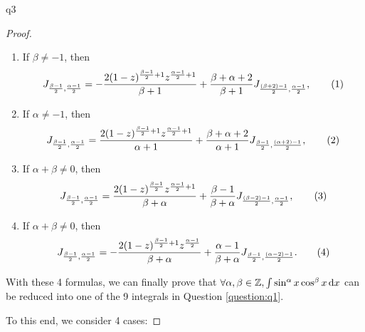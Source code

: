 \documentclass[reqno]{alittlebear}
\begin{document}
\begin{exercise}{}{}
\begin{question}{}{q3}
\begin{proof}
            \begin{enumerate}
                \item If $\beta\neq-1$, then \[J_{\frac{\beta-1}{2},\frac{\alpha-1}{2}} = -\frac{2(1-z)^{\frac{\beta-1}{2}+1}z^{\frac{\alpha-1}{2}+1}}{\beta+1}+\frac{\beta+\alpha+2}{\beta+1}J_{\frac{(\beta+2)-1}{2},\frac{\alpha-1}{2}},\numberthis\label{first}\]
                \item If $\alpha\neq-1$, then \[J_{\frac{\beta-1}{2},\frac{\alpha-1}{2}}=\frac{2(1-z)^{\frac{\beta-1}{2}+1}z^{\frac{\alpha-1}{2}+1}}{\alpha+1}+\frac{\beta+\alpha+2}{\alpha+1}J_{\frac{\beta-1}{2},\frac{(\alpha+2)-1}{2}},\numberthis\label{second}\]
                \item If $\alpha+\beta\neq0$, then \[J_{\frac{\beta-1}{2},\frac{\alpha-1}{2}}=\frac{2(1-z)^{\frac{\beta-1}{2}}z^{\frac{\alpha-1}{2}+1}}{\beta+\alpha}+\frac{\beta-1}{\beta+\alpha}J_{\frac{(\beta-2)-1}{2},\frac{\alpha-1}{2}},\numberthis\label{third}\]
                \item If $\alpha+\beta\neq0$, then \[J_{\frac{\beta-1}{2},\frac{\alpha-1}{2}}=-\frac{2(1-z)^{\frac{\beta-1}{2}+1}z^{\frac{\alpha-1}{2}}}{\beta+\alpha}+\frac{\alpha-1}{\beta+\alpha}J_{\frac{\beta-1}{2},\frac{(\alpha-2)-1}{2}}.\numberthis\label{fourth}\]
            \end{enumerate}

            With these 4 formulas, we can finally prove that $\forall\alpha,\beta\in\mathbb{Z}, \int \sin^\alpha x\cos^\beta x\mathop{}\!\mathrm{d} x$ can be reduced into one of the 9 integrals in Question \ref{question:q1}.

            To this end, we consider 4 cases:


\end{proof}
\end{question}
\end{exercise}
\end{document}
